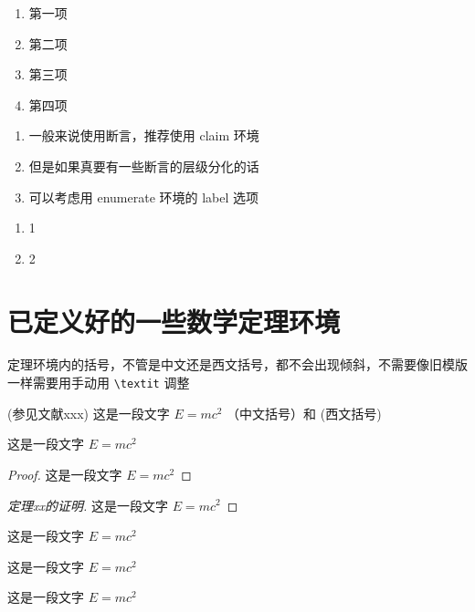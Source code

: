 \begin{enumerate}[I]
  \item 第一项
  \item 第二项
  \item 第三项
  \item 第四项
\end{enumerate}

\begin{enumerate}[label = \textbf{断言} \Alph*]
  \item 一般来说使用断言，推荐使用 claim 环境
  \item 但是如果真要有一些断言的层级分化的话
  \item 可以考虑用 enumerate 环境的 label 选项
\end{enumerate}

\begin{enumerate}[\textbf{断言} A]
  \item 1
  \item 2
\end{enumerate}


\section{已定义好的一些数学定理环境}

定理环境内的括号，不管是中文还是西文括号，都不会出现倾斜，不需要像旧模版一样需要用手动用 \verb|\textit| 调整
\begin{definition}[测度]
  (参见文献xxx) 这是一段文字 $E = m c^2$  （中文括号）和 (西文括号)
\end{definition}

\begin{theorem}
  这是一段文字 $E = m c^2$
\end{theorem}

\begin{proof}
  这是一段文字 $E = m c^2$
\end{proof}

\begin{proof}[定理xx的证明]
  这是一段文字 $E = m c^2$
\end{proof}

\begin{example}
  这是一段文字 $E = m c^2$
\end{example}

\begin{property}
  这是一段文字 $E = m c^2$
\end{property}

\begin{proposition}
  这是一段文字 $E = m c^2$
\end{proposition}

